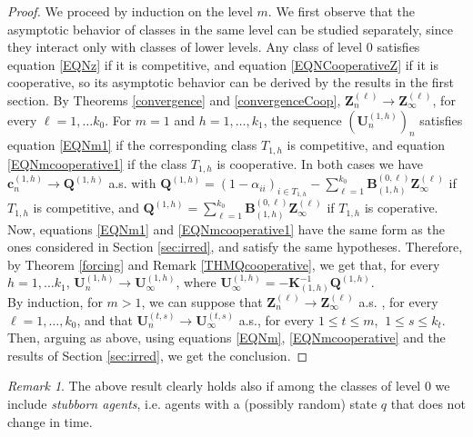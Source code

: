 \documentclass[article,12pt]{article}
\theoremstyle{plain}
\theoremstyle{definition}
\theoremstyle{remark}
\newtheorem{remark}{Remark}
\numberwithin{equation}{section}
\numberwithin{theorem}{section}
\begin{document}
		\begin{proof}
			We proceed by induction on the level $m$. We first observe that the asymptotic behavior of classes in the same level can be studied separately, since they interact only with classes of lower levels. 
			Any class of level $0$ satisfies equation \eqref{EQNz} if it is competitive, and equation \eqref{EQNCooperativeZ} if it is cooperative, so its asymptotic behavior can be derived by the results in the first section. By Theorems \ref{convergence} and \ref{convergenceCoop}, $\mathbf{Z}^{(\ell)}_n\longrightarrow \mathbf{Z}^{(\ell)}_\infty$, for every $\ell=1,\ldots k_0$. For $m=1$ and $h=1,\ldots, k_1$, the sequence $(\mathbf{U}^{(1,h)}_n)_n$ satisfies equation \eqref{EQNm1} if the corresponding class $T_{1,h}$ is competitive, and equation \eqref{EQNmcooperative1} if the class $T_{1,h}$ is cooperative. In both cases we have $\mathbf{c}^{(1,h)}_n\longrightarrow \mathbf{Q}^{(1,h)}$ a.s. with $\mathbf{Q}^{(1,h)}=(1-\alpha_{ii})_{i\in T_{1,h}}-\sum_{\ell=1}^{k_0}\mathbf{B}_{(1, h)}^{(0, \ell)}\mathbf{Z}^{(\ell)}_\infty$ if $T_{1, h}$ is competitive, and  $\mathbf{Q}^{(1,h)}=\sum_{\ell=1}^{k_0} \mathbf{B}_{(1, h)}^{(0, \ell)}\mathbf{Z}^{(\ell)}_\infty$ if $T_{1, h}$ is coperative. 
			Now, equations \eqref{EQNm1} and \eqref{EQNmcooperative1} have the same form as the ones considered in Section \ref{sec:irred}, and satisfy the same hypotheses. Therefore, by Theorem \ref{forcing} and Remark \ref{THMQcooperative}, we get that, for every $h=1,\ldots k_1$,  $\mathbf{U}^{(1,h)}_n\longrightarrow \mathbf{U}^{(1,h)}_\infty$, where $\mathbf{U}^{(1,h)}_\infty=-\mathbf{K}_{(1,h)}^{-1}\mathbf{Q}^{(1, h)}$.\\
			By induction, for $m>1$, we can suppose that  $\mathbf{Z}^{(\ell)}_n\longrightarrow \mathbf{Z}^{(\ell)}_\infty$ a.s. , for every $\ell=1,\ldots, k_0$, and that $\mathbf{U}^{(t,s)}_n\longrightarrow \mathbf{U}^{(t,s)}_\infty$ a.s., for every $1\leq t\leq m$, $\ 1\leq s\leq k_t$. Then, arguing as above, using equations \eqref{EQNm}, \eqref{EQNmcooperative} and the results of Section \ref{sec:irred}, we get the conclusion.  
		\end{proof}
		\begin{remark}
			The above result clearly holds also if among the classes of level 0 we include \emph{stubborn agents}, i.e. agents with a (possibly random) state $q$ that does not change in time. 
		\end{remark}
		
		
		
		
		
		
		
		
		
		
		
		
	
\end{document}
